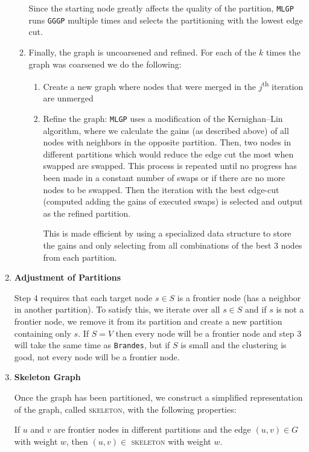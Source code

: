 \documentclass[a4paper,12pt]{article}
\begin{document}
\begin{enumerate}[label = \textbf{\arabic*.}]
\begin{enumerate}[label = \arabic*.]
Since the starting node greatly affects the quality of the partition, \texttt{MLGP} runs \texttt{GGGP} multiple times and selects the partitioning with the lowest edge cut.

\item Finally, the graph is uncoarsened and refined. For each of the $k$ times the graph was coarsened we do the following: 
\begin{enumerate}
\item Create a new graph where nodes that were merged in the $j$\textsuperscript{th} iteration are unmerged


\item Refine the graph: \texttt{MLGP} uses a modification of the \nohyphens{Kernighan–Lin} algorithm, where we calculate the gains (as described above) of all nodes with neighbors in the opposite partition. Then, two nodes in different partitions which would reduce the edge cut the most when swapped are swapped. This process is repeated until no progress has been made in a constant number of swaps or if there are no more nodes to be swapped. Then the iteration with the best edge-cut (computed adding the gains of executed swaps) is selected and output as the refined partition.

This is made efficient by using a specialized data structure to store the gains and only selecting from all combinations of the best 3 nodes from each partition.
\end{enumerate}
\end{enumerate}

\item \textbf{Adjustment of Partitions}


Step 4 requires that each target node $s \in S$ is a frontier node (has a neighbor in another partition). To satisfy this, we iterate over all $s \in S$ and if $s$ is not a frontier node, we remove it from its partition and create a new partition containing only $s$. If $S = V$ then every node will be a frontier node and step 3 will take the same time as \texttt{Brandes}, but if $S$ is small and the clustering is good, not every node will be a frontier node.
\item \textbf{Skeleton Graph}

Once the graph has been partitioned, we construct a simplified representation of the graph, called \textsc{skeleton}, with the following properties:

If $u$ and $v$ are frontier nodes in different partitions and the edge $(u,v) \in G$ with weight $w$, then $(u,v) \in $ \textsc{skeleton} with weight $w$. 


\end{enumerate}
\end{document}
